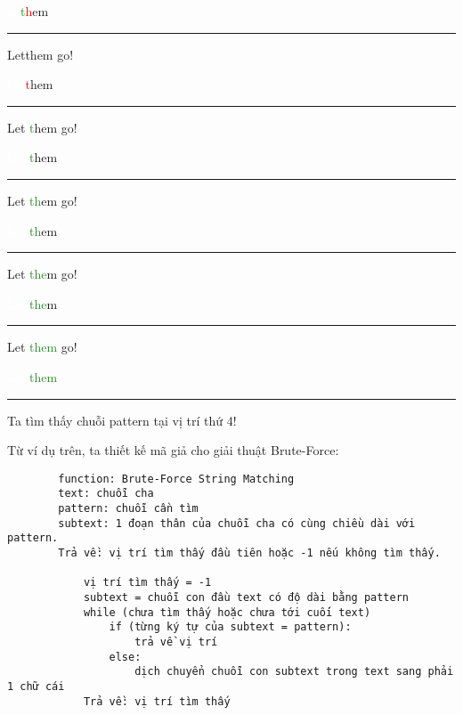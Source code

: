 \documentclass[a4paper,11pt]{article}
\begin{document}
		\textcolor{white}{Le}\textcolor{ForestGreen}{t}\textcolor{red}{h}em

		\vspace*{2mm}
		\hrule
		Let\textcolor{red}{\textvisiblespace}them go!
		
		\textcolor{white}{Let}\textcolor{red}{t}hem
		
		\vspace*{2mm}
		\hrule
		Let \textcolor{ForestGreen}{t}hem go!
		
		\textcolor{white}{Let }\textcolor{ForestGreen}{t}hem

		\vspace*{2mm}
		\hrule
		Let \textcolor{ForestGreen}{th}em go!
		
		\textcolor{white}{Let }\textcolor{ForestGreen}{th}em
		
		\vspace*{2mm}
		\hrule
		Let \textcolor{ForestGreen}{the}m go!
		
		\textcolor{white}{Let }\textcolor{ForestGreen}{the}m
					
		\vspace*{2mm}
		\hrule
		Let \textcolor{ForestGreen}{them} go!
		
		\textcolor{white}{Let }\textcolor{ForestGreen}{them}
		\vspace*{2mm}
		\hrule

		Ta tìm thấy chuỗi pattern tại vị trí thứ 4!
		
		\vspace*{4mm}
		
		Từ ví dụ trên, ta thiết kế mã giả cho giải thuật Brute-Force:

		\begin{lstlisting}
		function: Brute-Force String Matching
		text: chuỗi cha 
		pattern: chuỗi cần tìm 
		subtext: 1 đoạn thân của chuỗi cha có cùng chiều dài với pattern.
		Trả về: vị trí tìm thấy đầu tiên hoặc -1 nếu không tìm thấy.
		
			vị trí tìm thấy = -1
			subtext = chuỗi con đầu text có độ dài bằng pattern
			while (chưa tìm thấy hoặc chưa tới cuối text)
				if (từng ký tự của subtext = pattern):
					trả về vị trí
				else:
					dịch chuyển chuỗi con subtext trong text sang phải 1 chữ cái
			Trả về: vị trí tìm thấy
				\end{lstlisting}
		
\end{document}
